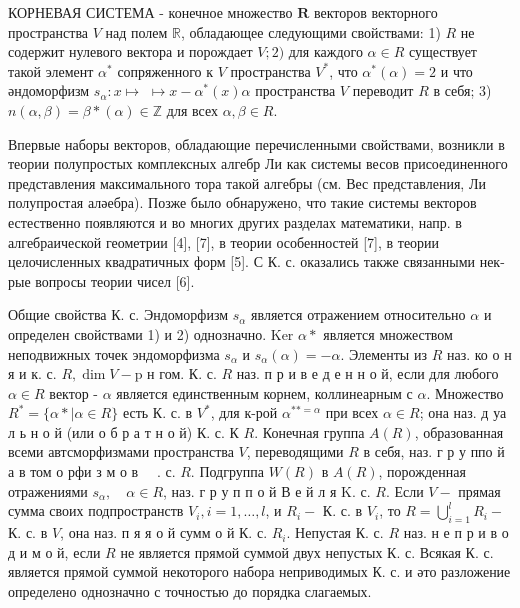 \documentclass[10pt]{article}
\begin{document}
КОРНЕВАЯ СИСТЕМА - конечное множество $\boldsymbol{R}$ векторов векторного пространства $V$ над полем $\mathbb{R}$, обладающее следующими свойствами: 1) $R$ не содержит нулевого вектора и порождает $V ; 2)$ для каждого $\alpha \in R$ существует такой элемент $\alpha^{*}$ сопряженного к $V$ пространства $V^{*}$, что $\alpha^{*}(\alpha)=2$ и что әндоморфизм $s_{\alpha}: x \longmapsto$ $\longmapsto x-\alpha^{*}(x) \alpha$ пространства $V$ переводит $R$ в себя; 3) $n(\alpha, \beta)=\beta *(\alpha) \in \mathbb{Z}$ для всех $\alpha, \beta \in R$.



Впервые наборы векторов, обладающие перечисленными свойствами, возникли в теории полупростых комплексных алгебр Ли как системы весов присоединенного представления максимального тора такой алгебры (см. Вес представления, Ли полупростая аләебра). Позже было обнаружено, что такие системы векторов естественно появляются и во многих других разделах математики, напр. в алгебраической геометрии [4], [7], в теории особенностей [7], в теории целочисленных квадратичных форм [5]. С К. с. оказались также связанными нек-рые вопросы теории чисел [6].



Общие свойства К. с. Эндоморфизм $s_{\alpha}$ является отражением относительно $\alpha$ и определен свойствами 1) и 2) однозначно. Ker $\alpha *$ является множеством неподвижных точек эндоморфизма $s_{\alpha}$ и $s_{\alpha}(\alpha)=-\alpha$. Элементы из $R$ наз. ко о н я и к. с. $R, \operatorname{dim} V-\mathrm{p}$ н гом. К. с. $R$ наз. п р и в е д е н н о й, если для любого $\alpha \in R$ вектор - $\alpha$ является единственным корнем, коллинеарным с $\alpha$. Множество $R^{*}=\{\alpha * \mid \alpha \in R\}$ есть К. с. в $V^{*}$, для к-рой $\alpha^{* *=\alpha}$ при всех $\alpha \in R$; она наз. д уа л ь н о й (или о б р а т н о й) К. с. К $R$. Конечная группа $A(R)$, образованная всеми автсморфизмами пространства $V$, переводящими $R$ в себя, наз. г р у ппо й а в том о рфи з м о в $\quad$. с. $R$. Подгруппа $W(R)$ в $A(R)$, порожденная отражениями $s_{\alpha}, \quad \alpha \in R$, наз. г р у п п о й В е й л я K. с. $R$. Если $V-$ прямая сумма своих подпространств $V_{i}, i=1, \ldots, l$, и $R_{i}-$ К. с. в $V_{i}$, то $R=\bigcup_{i=1}^{l} R_{i}-$ К. с. в $V$, она наз. п я я о й сумм о й К. с. $R_{i}$. Непустая К. с. $R$ наз. н е п р и в о д и м о й, если $R$ не является прямой суммой двух непустых К. с. Всякая К. с. является прямой суммой некоторого набора неприводимых К. с. и әто разложение определено однозначно с точностью до порядка слагаемых.
\end{document}
